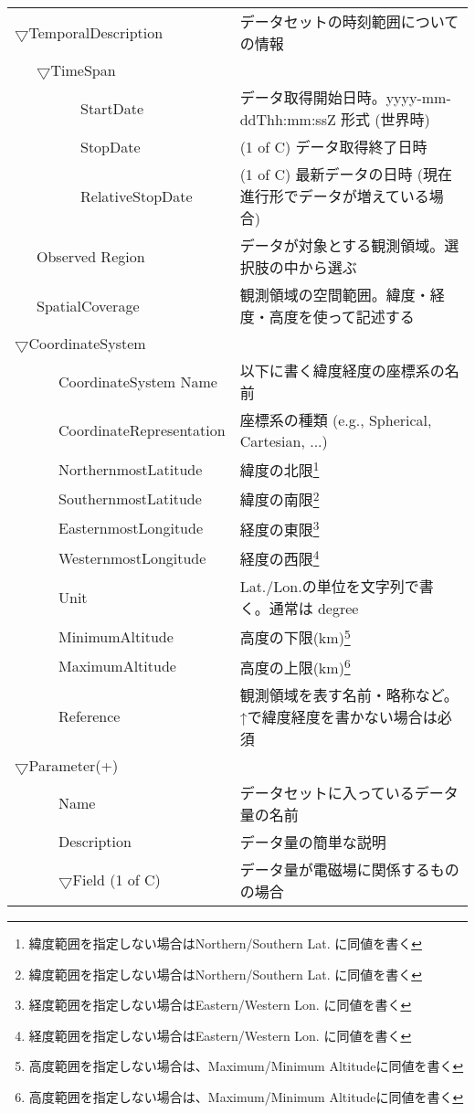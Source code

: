 \begin{table}[ht]
\begin{center}
{\begin{tabular}{ll}
$\bigtriangledown$TemporalDescription & データセットの時刻範囲についての情報\\
\ \ \ $\bigtriangledown$TimeSpan & \\
\ \ \ \ \ \ \ \ \ StartDate & データ取得開始日時。yyyy-mm-ddThh:mm:ssZ 形式 (世界時)\\
\ \ \ \ \ \ \ \ \ StopDate & (1 of C) データ取得終了日時\\
\ \ \ \ \ \ \ \ \ RelativeStopDate & (1 of C) 最新データの日時 (現在進行形でデータが増えている場合)\\ 
\ \ \ Observed Region & データが対象とする観測領域。選択肢の中から選ぶ\\
\ \ \ SpatialCoverage & 観測領域の空間範囲。緯度・経度・高度を使って記述する\\
$\bigtriangledown$CoordinateSystem & \\
\ \ \ \ \ \ CoordinateSystem Name & 以下に書く緯度経度の座標系の名前\\
\ \ \ \ \ \ CoordinateRepresentation & 座標系の種類 (e.g., Spherical, Cartesian, ...)\\
\ \ \ \ \ \ NorthernmostLatitude & 緯度の北限\footnote{緯度範囲を指定しない場合はNorthern/Southern Lat. に同値を書く}\\
\ \ \ \ \ \ SouthernmostLatitude & 緯度の南限\footnote{緯度範囲を指定しない場合はNorthern/Southern Lat. に同値を書く}\\
\ \ \ \ \ \ EasternmostLongitude & 経度の東限\footnote{経度範囲を指定しない場合はEastern/Western Lon. に同値を書く}\\
\ \ \ \ \ \ WesternmostLongitude & 経度の西限\footnote{経度範囲を指定しない場合はEastern/Western Lon. に同値を書く}\\
\ \ \ \ \ \ Unit & Lat./Lon.の単位を文字列で書く。通常は degree\\
\ \ \ \ \ \ MinimumAltitude & 高度の下限(km)\footnote{高度範囲を指定しない場合は、Maximum/Minimum Altitudeに同値を書く}\\
\ \ \ \ \ \ MaximumAltitude & 高度の上限(km)\footnote{高度範囲を指定しない場合は、Maximum/Minimum Altitudeに同値を書く}\\
\ \ \ \ \ \ Reference & 観測領域を表す名前・略称など。↑で緯度経度を書かない場合は必須\\
$\bigtriangledown$Parameter(+) & \\
\ \ \ \ \ \ Name & データセットに入っているデータ量の名前\\
\ \ \ \ \ \ Description & データ量の簡単な説明\\
\ \ \ \ \ \ $\bigtriangledown$Field (1 of C) & データ量が電磁場に関係するものの場合\\

\end{tabular}}
\end{center}
\end{table}
